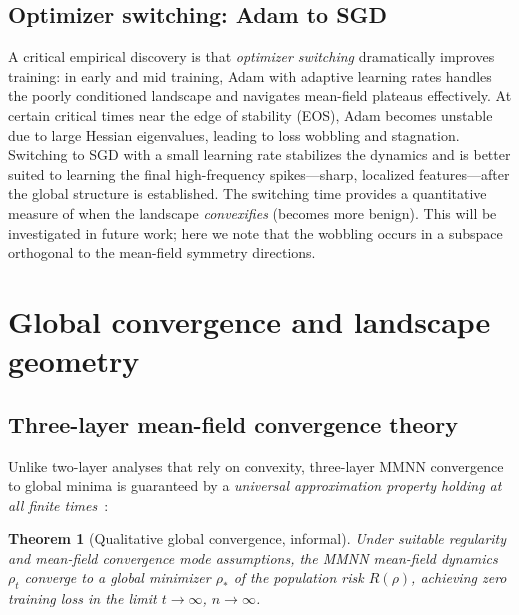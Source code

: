 \documentclass{article}
\newtheorem{theorem}{Theorem}
\begin{document}
\vspace{1em}
\subsection{Optimizer switching: Adam to SGD}
A critical empirical discovery is that \emph{optimizer switching} dramatically improves training:
in early and mid training, Adam with adaptive learning rates handles the poorly conditioned landscape and navigates mean-field plateaus effectively. At certain critical times near the edge of stability (EOS), Adam becomes unstable due to large Hessian eigenvalues, leading to loss wobbling and stagnation. Switching to SGD with a small learning rate stabilizes the dynamics and is better suited to learning the final high-frequency spikes—sharp, localized features—after the global structure is established.
The switching time provides a quantitative measure of when the landscape \emph{convexifies} (becomes more benign). This will be investigated in future work; here we note that the wobbling occurs in a subspace orthogonal to the mean-field symmetry directions.

\vspace{2em}
\section{Global convergence and landscape geometry}

\vspace{1em}
\subsection{Three-layer mean-field convergence theory}
Unlike two-layer analyses that rely on convexity, three-layer MMNN convergence to global minima is guaranteed by a \emph{universal approximation property holding at all finite times}~\cite{globalconvergencesthreelayer}:

\begin{theorem}[Qualitative global convergence, informal]
\label{thm:global_convergence_informal}
Under suitable regularity and mean-field convergence mode assumptions, the MMNN mean-field dynamics \( \rho_t \) converge to a global minimizer \( \rho_* \) of the population risk \( R(\rho) \), achieving zero training loss in the limit \( t \to \infty \), \( n \to \infty \).
\end{theorem}
\end{document}
